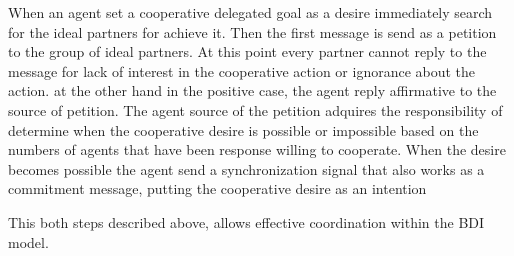 When an agent set a cooperative delegated goal as a desire immediately search for the ideal partners for achieve it. Then the first message is send  as a petition to the group of ideal partners. At this point every partner cannot reply to the message for lack of interest in the cooperative action or ignorance about the action. at the other hand in the positive case, the agent reply affirmative to the source of petition.
The agent source of the petition adquires the responsibility of determine when the cooperative desire is possible or impossible based on the numbers of agents that have been response willing to cooperate. When the desire becomes possible the agent send a synchronization signal that also works as a commitment message, putting the cooperative desire as an intention

This both steps described above, allows effective coordination within the BDI model. 

